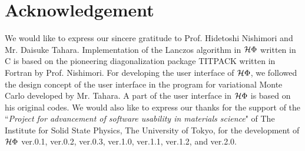 \chapter{Acknowledgement}
We would like to express our sincere gratitude to Prof. Hidetoshi Nishimori and Mr. Daisuke Tahara.
Implementation of the Lanczos algorithm in $\mathcal{H} \Phi$ written in C is based on the
pioneering diagonalization package TITPACK written in Fortran by Prof. Nishimori.
For developing the user interface of $\mathcal{H} \Phi$, we followed the design concept of
the user interface in the program for variational Monte Carlo developed by Mr. Tahara.
A part of the user interface in $\mathcal{H} \Phi$ is based on his original codes.
We would also like to express our thanks for the support of the ``{\it Project for advancement of software usability in materials science}" 
of The Institute for Solid State Physics, The University of Tokyo, for the development of $\mathcal{H} \Phi$ ver.0.1, ver.0.2, ver.0.3, ver.1.0, ver.1.1, ver.1.2, and ver.2.0.
